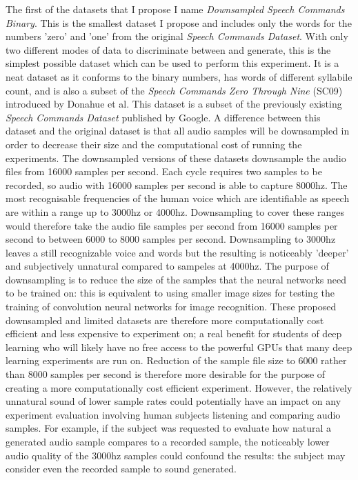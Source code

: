 \documentclass[a4paper, titlepage]{article}
\begin{document}
The first of the datasets that I propose I name \textit{Downsampled Speech Commands Binary}.
This is the smallest dataset I propose and includes only the words for the numbers 'zero' and 'one' from the original \textit{Speech Commands Dataset}.
With only two different modes of data to discriminate between and generate, this is the simplest possible dataset which can be used to perform this experiment.
It is a neat dataset as it conforms to the binary numbers, has words of different syllabile count, and is also a subset of the \textit{Speech Commands Zero Through Nine} (SC09) introduced by Donahue et al.
\newline
\newline
This dataset is a subset of the previously existing \textit{Speech Commands Dataset} \cite{speechcommands} published by Google.
A difference between this dataset and the original dataset is that all audio samples will be downsampled in order to decrease their size and the computational cost of running the experiments.
\newline
\newline
The downsampled versions of these datasets downsample the audio files from 16000 samples per second.
Each cycle requires two samples to be recorded, so audio with 16000 samples per second is able to capture 8000hz.
The most recognisable frequencies of the human voice which are identifiable as speech are within a range up to 3000hz or 4000hz.
Downsampling to cover these ranges would therefore take the audio file samples per second from 16000 samples per second to between 6000 to 8000 samples per second.
Downsampling to 3000hz leaves a still recognizable voice and words but the resulting is noticeably 'deeper' and subjectively unnatural compared to sampeles at 4000hz.
\newline
\newline
The purpose of downsampling is to reduce the size of the samples that the neural networks need to be trained on: this is equivalent to using smaller image sizes for testing the training of convolution neural networks for image recognition.
These proposed downsampled and limited datasets are therefore more computationally cost efficient and less expensive to experiment on; a real benefit for students of deep learning who will likely have no free access to the powerful GPUs that many deep learning experiments are run on.
\newline
\newline
Reduction of the sample file size to 6000 rather than 8000 samples per second is therefore more desirable for the purpose of creating a more computationally cost efficient experiment.
However, the relatively unnatural sound of lower sample rates could potentially have an impact on any experiment evaluation involving human subjects listening and comparing audio samples.
For example, if the subject was requested to evaluate how natural a generated audio sample compares to a recorded sample, the noticeably lower audio quality of the 3000hz samples could confound the results: the subject may consider even the recorded sample to sound generated.
\end{document}
